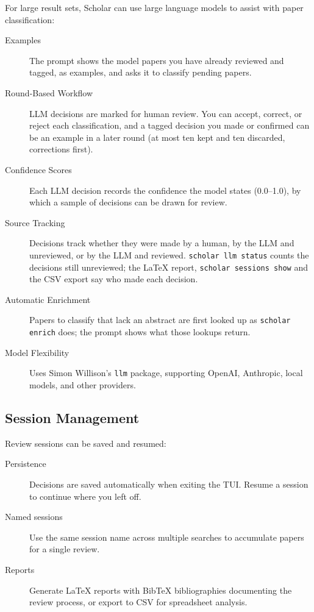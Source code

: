 For large result sets, Scholar can use large language models to assist with 
paper classification:
\begin{description}
\item[Examples] The prompt shows the model papers you have already
  reviewed and tagged, as examples, and asks it to classify pending
  papers.
\item[Round-Based Workflow] LLM decisions are marked for human review.
    You can accept, correct, or reject each classification, and a tagged
  decision you made or confirmed can be an example in a later round (at
  most ten kept and ten discarded, corrections first).
\item[Confidence Scores] Each LLM decision records the confidence the
  model states (0.0--1.0), by which a sample of decisions can be drawn
  for review.
\item[Source Tracking] Decisions track whether they were made by a human, 
  by the LLM and unreviewed, or by the LLM and reviewed.
  \texttt{scholar llm status} counts the decisions still unreviewed;
  the LaTeX report, \texttt{scholar sessions show} and the CSV export
  say who made each decision.
\item[Automatic Enrichment] Papers to classify that lack an abstract
  are first looked up as \texttt{scholar enrich} does; the prompt shows
  what those lookups return.
\item[Model Flexibility] Uses Simon Willison's \texttt{llm} package, 
  supporting OpenAI, Anthropic, local models, and other providers.
\end{description}

\subsection{Session Management}

Review sessions can be saved and resumed:
\begin{description}
\item[Persistence] Decisions are saved automatically when exiting the TUI.
  Resume a session to continue where you left off.
\item[Named sessions] Use the same session name across multiple searches to 
  accumulate papers for a single review.
\item[Reports] Generate \LaTeX{} reports with BibTeX bibliographies documenting 
  the review process, or export to CSV for spreadsheet analysis.
\end{description}


